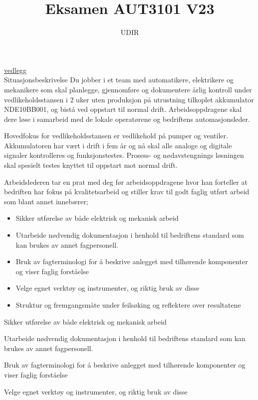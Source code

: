 \documentclass[12pt,a4paper]{article}
\begin{document}
\title{Eksamen AUT3101 V23}
\author{UDIR}
\maketitle
\href{https://rfka-my.sharepoint.com/:b:/g/personal/fred-olav_mosdal_skole_rogfk_no/EfPLJCqUpSRLqsAt8eUz9gABIPnCilD3gsXV23CZ_eATpQ?e=AQLd6l}{vedlegg}\\
Situasjonsbeskrivelse
\vskip  0.25cm
Du jobber i et team med automatikere, elektrikere og mekanikere som skal planlegge, gjennomføre og dokumentere årlig kontroll under vedlikeholdsstansen i 2 uker uten produksjon på utrustning tilkoplet akkumulator NDE10BB001, og bistå ved oppstart til normal drift. Arbeidsoppdragene skal dere løse i samarbeid med de lokale operatørene og bedriftens automasjonsleder.

\vskip  0.25cm
Hovedfokus for vedlikeholdsstansen er vedlikehold på pumper og ventiler. Akkumulatoren har vært i drift i fem år og nå skal alle analoge og digitale signaler kontrolleres og funksjonstestes. Prosess- og nødavstengnings løsningen skal spesielt testes knyttet til oppstart mot normal drift.

\vskip  0.25cm
Arbeidslederen tar en prat med deg før arbeidsoppdragene hvor han forteller at bedriften har fokus på kvalitetsarbeid og stiller krav til godt faglig utført arbeid som blant annet innebærer;
\begin{itemize}
	\item Sikker utførelse av både elektrisk og mekanisk arbeid
	\item Utarbeide nødvendig dokumentasjon i henhold til bedriftens standard som kan brukes av annet fagpersonell.
	\item Bruk av fagterminologi for å beskrive anlegget med tilhørende komponenter og viser faglig forståelse
	\item Velge egnet verktøy og instrumenter, og riktig bruk av disse
	\item Struktur og fremgangsmåte under feilsøking og reflektere over resultatene
\end{itemize}
Sikker utførelse av både elektrisk og mekanisk arbeid

Utarbeide nødvendig dokumentasjon i henhold til bedriftens standard som kan brukes av annet fagpersonell.

Bruk av fagterminologi for å beskrive anlegget med tilhørende komponenter og viser faglig forståelse

Velge egnet verktøy og instrumenter, og riktig bruk av disse
\end{document}
